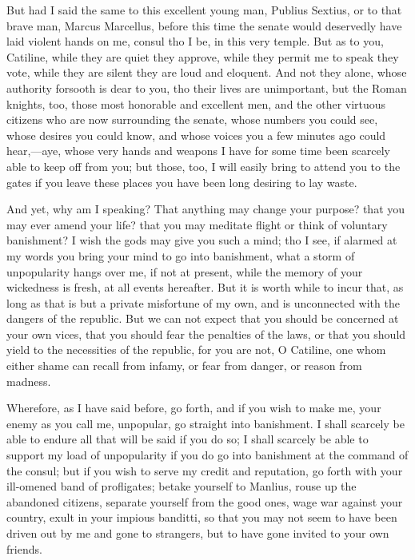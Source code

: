 \documentclass[a4paper]{amsbook}
\begin{document}
But had I said the same to this excellent young man, Publius Sextius, or to that brave man, Marcus Marcellus, before this time the senate would deservedly have laid violent hands on me, consul tho I be, in this very temple. But as to you, Catiline, while they are quiet they approve, while they permit me to speak they vote, while they are silent they are loud and eloquent. And not they alone, whose authority forsooth is dear to you, tho their lives are unimportant, but the Roman knights, too, those most honorable and excellent men, and the other virtuous citizens who are now surrounding the senate, whose numbers you could see, whose desires you could know, and whose voices you a few minutes ago could hear,—aye, whose very hands and weapons I have for some time been scarcely able to keep off from you; but those, too, I will easily bring to attend you to the gates if you leave these places you have been long desiring to lay waste.

And yet, why am I speaking? That anything may change your purpose? that you may ever amend your life? that you may meditate flight or think of voluntary banishment? I wish the gods may give you such a mind; tho I see, if alarmed at my words you bring your mind to go into banishment, what a storm of unpopularity hangs over me, if not at present, while the memory of your wickedness is fresh, at all events hereafter. But it is worth while to incur that, as long as that is but a private misfortune of my own, and is unconnected with the dangers of the republic. But we can not expect that you should be concerned at your own vices, that you should fear the penalties of the laws, or that you should yield to the necessities of the republic, for you are not, O Catiline, one whom either shame can recall from infamy, or fear from danger, or reason from madness.

Wherefore, as I have said before, go forth, and if you wish to make me, your enemy as you call me, unpopular, go straight into banishment. I shall scarcely be able to endure all that will be said if you do so; I shall scarcely be able to support my load of unpopularity if you do go into banishment at the command of the consul; but if you wish to serve my credit and reputation, go forth with your ill-omened band of profligates; betake yourself to Manlius, rouse up the abandoned citizens, separate yourself from the good ones, wage war against your country, exult in your impious banditti, so that you may not seem to have been driven out by me and gone to strangers, but to have gone invited to your own friends.
\end{document}
